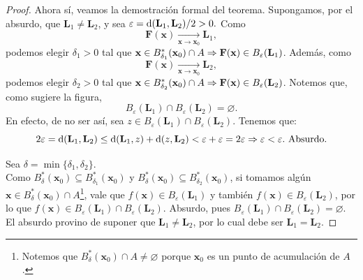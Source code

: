 \begin{theorem}
\begin{proof}
Ahora s\'i, veamos la demostraci\'on formal del teorema.  Supongamos, por el absurdo, que $\mathbf{L}_1 \ne \mathbf{L}_2$, y sea $\varepsilon = \operatorname{d}(\mathbf{L}_1,\mathbf{L}_2)/2 > 0.$  Como 
 \[
  \mathbf{F}(\mathbf{x}) \xrightarrow[\mathbf{x} \to \mathbf{x}_0]{} \mathbf{L}_1,
 \]
podemos elegir $\delta_1 > 0$ tal que $\mathbf{x} \in B_{\delta_1}^*(\mathbf{x}_0) \cap A \Rightarrow \mathbf{F}(\mathbf{x}) \in B_{\varepsilon}(\mathbf{L}_1)$. Adem\'as, como 
\[
 \mathbf{F}(\mathbf{x}) \xrightarrow[\mathbf{x} \to \mathbf{x}_0]{} \mathbf{L}_2,
\]
 podemos elegir $\delta_2 > 0$ tal que $\mathbf{x} \in B_{\delta_2}^*(\mathbf{x}_0) \cap A \Rightarrow \mathbf{F}(\mathbf{x}) \in B_{\varepsilon}(\mathbf{L}_2)$.  Notemos que, como sugiere la figura, 
 \[
  B_{\varepsilon}(\mathbf{L}_1) \cap B_{\varepsilon}(\mathbf{L}_2) = \varnothing.
 \]
 En efecto, de no ser as\'i, sea $z \in B_{\varepsilon}(\mathbf{L}_1) \cap B_{\varepsilon}(\mathbf{L}_2)$. Tenemos que:
 \[
  2 \varepsilon = \operatorname{d}(\mathbf{L}_1,\mathbf{L}_2) \le \operatorname{d}(\mathbf{L}_1,z) + \operatorname{d}(z,\mathbf{L}_2)
  < \varepsilon + \varepsilon = 2 \varepsilon \Rightarrow \varepsilon < \varepsilon. \text{ Absurdo.}
 \]

 Sea $\delta = \min\{ \delta_1, \delta_2 \}$. \\
 Como $B_{\delta}^*(\mathbf{x}_0)  \subseteq  B_{\delta_1}^*(\mathbf{x}_0)$ y $B_{\delta}^*(\mathbf{x}_0)  \subseteq  B_{\delta_2}^*(\mathbf{x}_0)$, si tomamos alg\'un $\mathbf{x} \in B_{\delta}^*(\mathbf{x}_0) \cap A$\footnote{Notemos que $B_{\delta}^*(\mathbf{x}_0) \cap A \ne \varnothing$ porque $\mathbf{x}_0$ es un punto de acumulaci\'on de $A$.}, vale que $f(\mathbf{x}) \in B_{\varepsilon}(\mathbf{L}_1)$ y tambi\'en $f(\mathbf{x}) \in B_{\varepsilon}(\mathbf{L}_2)$, por lo que $f(\mathbf{x}) \in B_{\varepsilon}(\mathbf{L}_1) \cap B_{\varepsilon}(\mathbf{L}_2)$. Absurdo, pues $B_{\varepsilon}(\mathbf{L}_1) \cap B_{\varepsilon}(\mathbf{L}_2) = \varnothing$. El absurdo provino de suponer que $\mathbf{L}_1 \ne \mathbf{L}_2$, por lo cual debe ser $\mathbf{L}_1 = \mathbf{L}_2$.
\end{proof}

\end{theorem}
